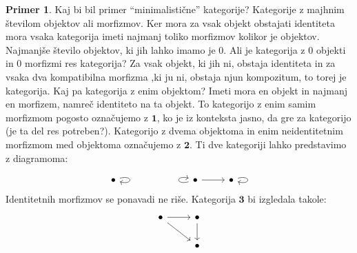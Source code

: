 \documentclass[12pt,a4paper]{book}
\theoremstyle{definition}
\theoremstyle{plain}
\theoremstyle{definition}
\newtheorem{primer}{Primer}[section]
\theoremstyle{remark}
\newcommand{\cat}[1]{\textbf{#1}}
\begin{document}
\begin{primer}
Kaj bi bil primer "`minimalistične"' kategorije? Kategorije z majhnim številom objektov ali morfizmov. Ker mora za vsak objekt obstajati identiteta mora vsaka kategorija imeti najmanj toliko morfizmov kolikor je objektov. Najmanjše število objektov, ki jih lahko imamo je 0. Ali je kategorija z 0 objekti in 0 morfizmi res kategorija? Za vsak objekt, ki jih ni, obstaja identiteta in za vsaka dva kompatibilna morfizma ,ki ju ni, obstaja njun kompozitum, to torej je kategorija. Kaj pa kategorija z enim objektom? Imeti mora en objekt in najmanj en morfizem, namreč identiteto na ta objekt. To kategorijo z enim samim morfizmom pogosto označujemo z $\mathbf{1}$, ko je iz konteksta jasno, da gre za kategorijo (je ta del res potreben?). Kategorijo z dvema objektoma in enim neidentitetnim morfizmom med objektoma označujemo z $\mathbf{2}$. Ti dve kategoriji lahko predstavimo z diagramoma:

\begin{equation}
\begin{tikzcd}
\bullet \arrow[loop right] &&&  \arrow[loop left] \bullet \arrow[r] & \bullet \arrow[loop right]
\end{tikzcd}
\end{equation}
%
Identitetnih morfizmov se ponavadi ne riše. Kategorija $\cat{3}$ bi izgledala takole:
%
\begin{equation}
\begin{tikzcd}
\bullet \arrow[r] \arrow[rd] & \bullet \arrow[d] \\
& \bullet
\end{tikzcd}
\end{equation}
\end{primer}
\end{document}
